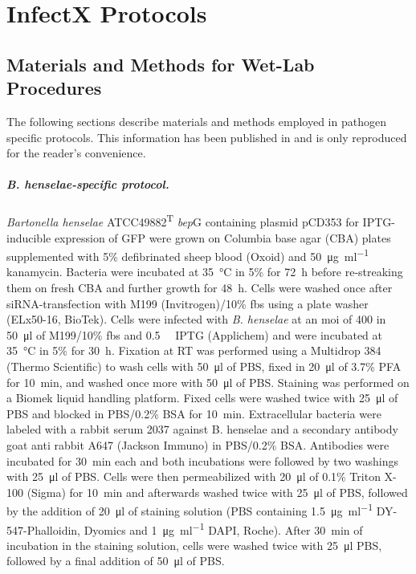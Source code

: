 \chapter{InfectX Protocols}

\section{Materials and Methods for Wet-Lab Procedures}
\label{sec:pathogen-protocols}
The following sections describe materials and methods employed in pathogen specific protocols. This information has been published in \cite{Ramo2014} and is only reproduced for the reader's convenience.

\paragraph{\textit{B. henselae}-specific protocol.}
\textit{Bartonella henselae} ATCC49882\textsuperscript{T} \textDelta\textit{bep}G containing plasmid pCD353 \citep{Dehio1998} for IPTG-inducible expression of GFP were grown on Columbia base agar (CBA) plates supplemented with 5\% defibrinated sheep blood (Oxoid) and \SI{50}{\micro\gram\per\milli\litre} kanamycin. Bacteria were incubated at \SI{35}{\celsius} in 5\%  for \SI{72}{\hour} before re-streaking them on fresh CBA and further growth for \SI{48}{\hour}. Cells were washed once after siRNA-transfection with M199 (Invitrogen)\slash 10\% \gls{fbs} using a plate washer (ELx50-16, BioTek). Cells were infected with \textit{B. henselae} at an \gls{moi} of 400 in \SI{50}{\micro\litre} of M199\slash 10\% \gls{fbs} and \SI{0.5}{\milli\Molar} IPTG (Applichem) and were incubated at \SI{35}{\celsius} in 5\%  for \SI{30}{\hour}. Fixation at RT was performed using a Multidrop 384 (Thermo Scientific) to wash cells with \SI{50}{\micro\litre} of PBS, fixed in \SI{20}{\micro\litre} of 3.7\% PFA for \SI{10}{\minute}, and washed once more with \SI{50}{\micro\litre} of PBS. Staining was performed on a Biomek liquid handling platform. Fixed cells were washed twice with \SI{25}{\micro\litre} of PBS and blocked in PBS\slash 0.2\% BSA for \SI{10}{\minute}. Extracellular bacteria were labeled with a rabbit serum 2037 against B. henselae \citep{Dehio1997} and a secondary antibody goat anti rabbit A647 (Jackson Immuno) in PBS\slash 0.2\% BSA. Antibodies were incubated for \SI{30}{\minute} each and both incubations were followed by two washings with \SI{25}{\micro\litre} of PBS. Cells were then permeabilized with \SI{20}{\micro\litre} of 0.1\% Triton X-100 (Sigma) for \SI{10}{\minute} and afterwards washed twice with \SI{25}{\micro\litre} of PBS, followed by the addition of \SI{20}{\micro\litre} of staining solution (PBS containing \SI{1.5}{\micro\gram\per\milli\litre} DY-547-Phalloidin, Dyomics and \SI{1}{\micro\gram\per\milli\litre} DAPI, Roche). After \SI{30}{\minute} of incubation in the staining solution, cells were washed twice with \SI{25}{\micro\litre} PBS, followed by a final addition of \SI{50}{\micro\litre} of PBS.

